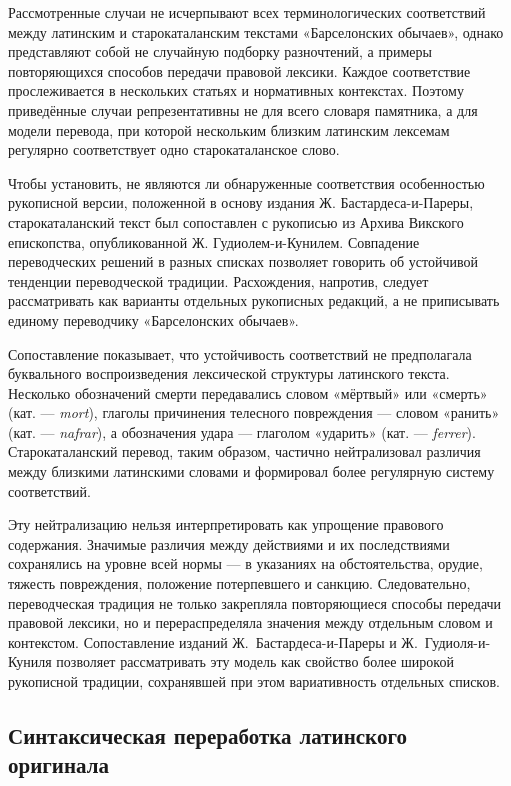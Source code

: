Рассмотренные случаи не исчерпывают всех терминологических соответствий между латинским и старокаталанским текстами «Барселонских обычаев», однако представляют собой не случайную подборку разночтений, а примеры повторяющихся способов передачи правовой лексики. Каждое соответствие прослеживается в нескольких статьях и нормативных контекстах. Поэтому приведённые случаи репрезентативны не для всего словаря памятника, а для модели перевода, при которой нескольким близким латинским лексемам регулярно соответствует одно старокаталанское слово.

Чтобы установить, не являются ли обнаруженные соответствия особенностью рукописной версии, положенной в основу издания Ж. Бастардеса-и-Пареры, старокаталанский текст был сопоставлен с рукописью из Архива Викского епископства, опубликованной Ж. Гудиолем-и-Кунилем. Совпадение переводческих решений в разных списках позволяет говорить об устойчивой тенденции переводческой традиции. Расхождения, напротив, следует рассматривать как варианты отдельных рукописных редакций, а не приписывать единому переводчику «Барселонских обычаев».

Сопоставление показывает, что устойчивость соответствий не предполагала буквального воспроизведения лексической структуры латинского текста. Несколько обозначений смерти передавались словом «мёртвый» или «смерть» (кат. --- \emph{mort}), глаголы причинения телесного повреждения --- словом «ранить» (кат. --- \emph{nafrar}), а обозначения удара --- глаголом «ударить» (кат. --- \emph{ferrer}). Старокаталанский перевод, таким образом, частично нейтрализовал различия между близкими латинскими словами и формировал более регулярную систему соответствий.

Эту нейтрализацию нельзя интерпретировать как упрощение правового содержания. Значимые различия между действиями и их последствиями сохранялись на уровне всей нормы --- в указаниях на обстоятельства, орудие, тяжесть повреждения, положение потерпевшего и санкцию. Следовательно, переводческая традиция не только закрепляла повторяющиеся способы передачи правовой лексики, но и перераспределяла значения между отдельным словом и контекстом. Сопоставление изданий Ж.~Бастардеса-и-Пареры и Ж.~Гудиоля-и-Куниля позволяет рассматривать эту модель как свойство более широкой рукописной традиции, сохранявшей при этом вариативность отдельных списков.

\subsection{Синтаксическая переработка латинского оригинала}

